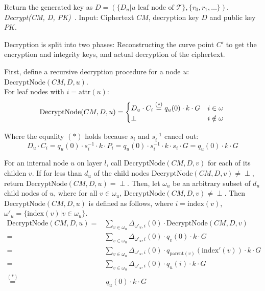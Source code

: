 Return the generated key as $D = (\{D_u | u \text{ leaf node of } \mathcal{T}\}, \{r_0, r_1, \dots \})$.
\\

\noindent \emph{Decrypt(CM, D, PK)}~\cite{yao_lightweight_2015}. Input: Ciphertext $CM$, decryption key $D$ and public key $PK$.

Decryption is split into two phases: Reconstructing the curve point $C'$ to get the encryption and integrity keys, and actual decryption of the ciphertext.

First, define a recursive decryption procedure for a node $u$: $\text{DecryptNode}(CM, D, u)$. \\
For leaf nodes with $i = \text{attr}(u)$:
\begin{equation*}
    \text{DecryptNode}(CM, D, u) = \begin{cases}
        D_u \cdot C_i \stackrel{(*)}{=} q_u(0) \cdot k \cdot G & i \in \omega\\
        \perp & i \notin \omega
    \end{cases}\\
\end{equation*}

Where the equality $(*)$ holds because $s_i$ and $s_i^{-1}$ cancel out: 
\begin{equation*}
    D_u \cdot C_i = q_u(0) \cdot s_i^{-1} \cdot k \cdot P_i = q_u(0) \cdot s_i^{-1} \cdot k \cdot s_i \cdot G = q_u(0) \cdot k \cdot G
\end{equation*}

For an internal node $u$ on layer $l$, call $\text{DecryptNode}(CM, D, v)$ for each of its childen $v$.
If for less than $d_u$ of the child nodes $\text{DecryptNode}(CM, D, v) \neq \perp$, return $\text{DecryptNode}(CM, D, u)=\perp$.
Then, let $\omega_u$ be an arbitrary subset of $d_u$ child nodes of $u$, where for all $v \in \omega_u$, $\text{DecryptNode}(CM, D, v) \neq \perp$.
Then $\text{DecryptNode}(CM, D, u)$ is defined as follows, where $i = \text{index}(v)$, $\omega'_u = \{\text{index}(v) | v \in \omega_u\}$.
\begin{equation*}
    \begin{split}
        \text{DecryptNode}(CM, D, u) =& \sum_{v \in \omega_u} \Delta_{\omega'_u, i}(0) \cdot \text{DecryptNode}(CM, D, v)\\
        =& \sum_{v \in \omega_u} \Delta_{\omega'_u, i}(0) \cdot q_v(0) \cdot k \cdot G\\
        =& \sum_{v \in \omega_u} \Delta_{\omega'_u, i}(0) \cdot q_{\text{parent}(v)}(\text{index}'(v)) \cdot k \cdot G\\
        =& \sum_{v \in \omega_u} \Delta_{\omega'_u, i}(0) \cdot q_u(i) \cdot k \cdot G\\
        \stackrel{(*)}{=}&~q_u(0) \cdot k \cdot G
    \end{split}
\end{equation*}

